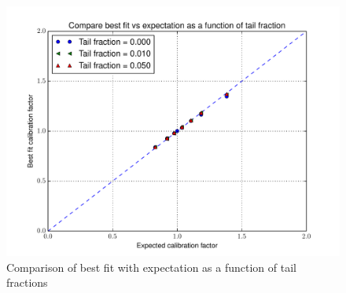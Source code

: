  \begin{figure}[htbp] \begin{center} 
\includegraphics[width=1.00\textwidth]{../FIGURES/30/FIG_Compare_best_fit_vs_expectation_as_a_function_of_tail_fraction.pdf} 
\caption{Comparison of best fit with expectation as a function of tail fractions} 
\label{tab:extra_30} 
\end{center} \end{figure} 

 
